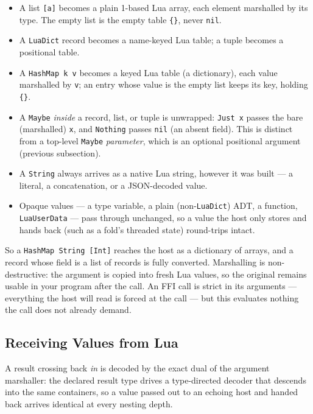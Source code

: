\documentclass[11pt,a4paper]{article}
\begin{document}
\begin{itemize}
  \item A list \texttt{[a]} becomes a plain 1-based Lua array, each
    element marshalled by its type.  The empty list is the empty table
    \texttt{\{\}}, never \texttt{nil}.
  \item A \texttt{LuaDict} record becomes a name-keyed Lua table; a tuple
    becomes a positional table.
  \item A \texttt{HashMap k v} becomes a keyed Lua table (a
    dictionary), each value marshalled by \texttt{v}; an entry whose
    value is the empty list keeps its key, holding \texttt{\{\}}.
  \item A \texttt{Maybe} \emph{inside} a record, list, or tuple is
    unwrapped: \texttt{Just x} passes the bare (marshalled) \texttt{x},
    and \texttt{Nothing} passes \texttt{nil} (an absent field).  This is
    distinct from a top-level \texttt{Maybe} \emph{parameter}, which is an
    optional positional argument (previous subsection).
  \item A \texttt{String} always arrives as a native Lua string, however
    it was built --- a literal, a concatenation, or a JSON-decoded value.
  \item Opaque values --- a type variable, a plain (non-\texttt{LuaDict})
    ADT, a function, \texttt{LuaUserData} --- pass through unchanged, so a
    value the host only stores and hands back (such as a fold's threaded
    state) round-trips intact.
\end{itemize}

So a \texttt{HashMap String [Int]} reaches the host as a dictionary
of arrays, and a record whose field is a list of records is fully
converted.  Marshalling is non-destructive: the argument is copied into
fresh Lua values, so the original remains usable in your program after
the call.  An FFI call is strict in its arguments --- everything the
host will read is forced at the call --- but this evaluates nothing the
call does not already demand.

\subsection{Receiving Values from Lua}
\label{sec:resultmarshal}

A result crossing back \emph{in} is decoded by the exact dual of the
argument marshaller: the declared result type drives a type-directed
decoder that descends into the same containers, so a value passed out
to an echoing host and handed back arrives identical at every nesting
depth.
\end{document}

